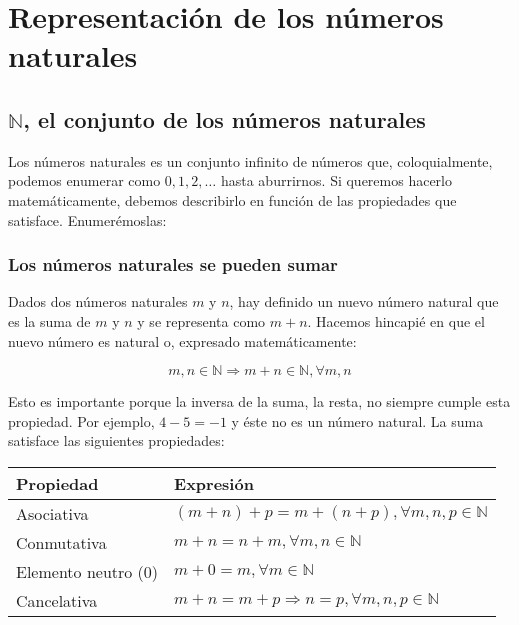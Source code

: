 \section{Representación de los números naturales}\label{representacion-de-los-numeros-naturales}

\subsection{$\mathbb{N}$, el conjunto de los números naturales}\label{el-conjunto-de-los-numeros-naturales}

Los números naturales es un conjunto infinito de números que, coloquialmente, podemos enumerar como $0,1,2,\ldots$ hasta aburrirnos.
Si queremos hacerlo matemáticamente, debemos describirlo en función de las propiedades que satisface.
Enumerémoslas:

\subsubsection{Los números naturales se pueden sumar}

Dados dos números naturales $m$ y $n$, hay definido un nuevo número natural que es la suma de $m$ y $n$ y se representa como $m+n$.
Hacemos hincapié en que el nuevo número es natural o, expresado matemáticamente:

\[m,n \in\mathbb{N} \Rightarrow m+n \in\mathbb{N}, \forall m,n\]

Esto es importante porque la inversa de la suma, la resta, no siempre cumple esta propiedad.
Por ejemplo, $4-5=-1$ y éste no es un número natural.
La suma satisface las siguientes propiedades:

\begin{center}
\begin{tabular}{l l}
	\textbf{Propiedad}  & \textbf{Expresión}                                       \\
	\toprule
	Asociativa          & $(m+n) + p = m + (n+p), \forall m,n,p \in\mathbb{N}$     \\
	Conmutativa         & $m+n = n+m, \forall m,n \in\mathbb{N}$                   \\
	Elemento neutro (0) & $m+0 = m, \forall m \in\mathbb{N}$                       \\
	Cancelativa         & $m+n = m+p \Rightarrow n=p, \forall m,n,p \in\mathbb{N}$ \\
\end{tabular}
\end{center}

